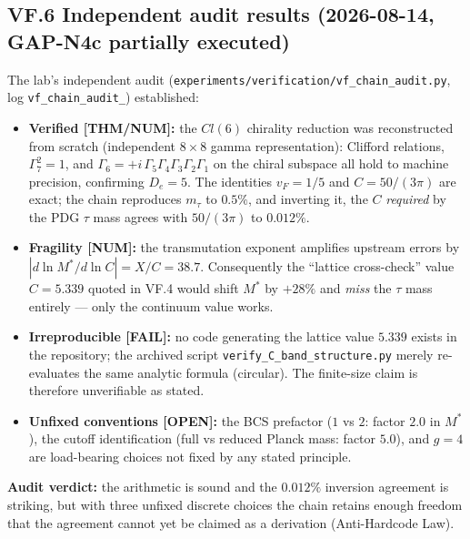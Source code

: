 \subsection*{VF.6 Independent audit results (2026-08-14, GAP-N4c partially executed)}
The lab's independent audit (\texttt{experiments/\allowbreak verification/\allowbreak vf\_\allowbreak chain\_\allowbreak audit.py}, log
\texttt{vf\_\allowbreak chain\_\allowbreak audit\_}) established:
\begin{itemize}
\item \textbf{Verified [THM/NUM]:} the $Cl(6)$ chirality reduction was reconstructed from
scratch (independent $8\times8$ gamma representation): Clifford relations, $\Gamma_7^2=1$,
and $\Gamma_6=+i\,\Gamma_5\Gamma_4\Gamma_3\Gamma_2\Gamma_1$ on the chiral subspace all hold
to machine precision, confirming $D_e=5$. The identities $v_F=1/5$ and $C=50/(3\pi)$ are
exact; the chain reproduces $m_\tau$ to $0.5\%$, and inverting it, the $C$ \emph{required}
by the PDG $\tau$ mass agrees with $50/(3\pi)$ to $0.012\%$.
\item \textbf{Fragility [NUM]:} the transmutation exponent amplifies upstream errors by
$|d\ln M^*/d\ln C| = X/C = 38.7$. Consequently the ``lattice cross-check'' value
$C=5.339$ quoted in VF.4 would shift $M^*$ by $+28\%$ and \emph{miss} the $\tau$ mass
entirely --- only the continuum value works.
\item \textbf{Irreproducible [FAIL]:} no code generating the lattice value $5.339$ exists in
the repository; the archived script \texttt{verify\_\allowbreak C\_\allowbreak band\_\allowbreak structure.py} merely
re-evaluates the same analytic formula (circular). The finite-size claim is therefore
unverifiable as stated.
\item \textbf{Unfixed conventions [OPEN]:} the BCS prefactor ($1$ vs $2$: factor $2.0$ in
$M^*$), the cutoff identification (full vs reduced Planck mass: factor $5.0$), and
$g=4$ are load-bearing choices not fixed by any stated principle.
\end{itemize}
\textbf{Audit verdict:} the arithmetic is sound and the $0.012\%$ inversion agreement is
striking, but with three unfixed discrete choices the chain retains enough freedom that the
agreement cannot yet be claimed as a derivation (Anti-Hardcode Law).

